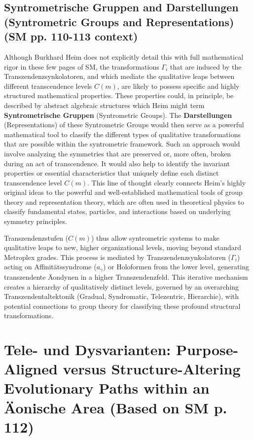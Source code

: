 \documentclass[
    12pt,              %
    a4paper,           %
    headings=normal,   %
    twoside=true,      %
    BCOR=8mm,          %
]{scrbook}
\newcommand{\conceptualsyndrome}{a}
\newcommand{\transzendenzstufe}[1]{C(#1)}
\newcommand{\transzendenzsynkolator}{\Gamma_i}
\begin{document}
\subsection{Syntrometrische Gruppen and Darstellungen (Syntrometric Groups and Representations) (SM pp. 110-113 context)}
\label{sec:ch6_syntrometrische_gruppen}
Although Burkhard Heim does not explicitly detail this with full mathematical rigor in these few pages of SM, the transformations \(\transzendenzsynkolator\) that are induced by the Transzendenzsynkolatoren, and which mediate the qualitative leaps between different transcendence levels \(\transzendenzstufe{m}\), are likely to possess specific and highly structured mathematical properties. These properties could, in principle, be described by abstract algebraic structures which Heim might term \textbf{Syntrometrische Gruppen} (Syntrometric Groups). The \textbf{Darstellungen} (Representations) of these Syntrometric Groups would then serve as a powerful mathematical tool to classify the different types of qualitative transformations that are possible within the syntrometric framework. Such an approach would involve analyzing the symmetries that are preserved or, more often, broken during an act of transcendence. It would also help to identify the invariant properties or essential characteristics that uniquely define each distinct transcendence level \(\transzendenzstufe{m}\). This line of thought clearly connects Heim’s highly original ideas to the powerful and well-established mathematical tools of group theory and representation theory, which are often used in theoretical physics to classify fundamental states, particles, and interactions based on underlying symmetry principles.

Transzendenzstufen (\(\transzendenzstufe{m}\)) thus allow syntrometric systems to make qualitative leaps to new, higher organizational levels, moving beyond standard Metroplex grades. This process is mediated by Transzendenzsynkolatoren (\(\transzendenzsynkolator\)) acting on Affinitätssyndrome (\(\conceptualsyndrome_\gamma\)) or Holoformen from the lower level, generating transzendente Äondynen in a higher Transzendenzfeld. This iterative mechanism creates a hierarchy of qualitatively distinct levels, governed by an overarching Transzendentaltektonik (Gradual, Syndromatic, Telezentric, Hierarchic), with potential connections to group theory for classifying these profound structural transformations.

\section{Tele- und Dysvarianten: Purpose-Aligned versus Structure-Altering Evolutionary Paths within an Äonische Area (Based on SM p. 112)}
\label{sec:ch6_tele_dysvarianten}
\end{document}

